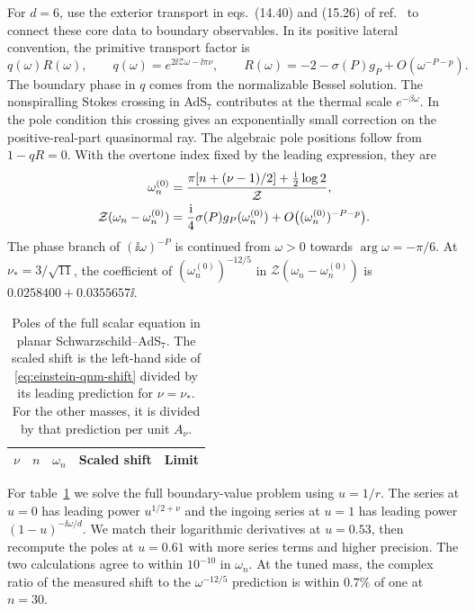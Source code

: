 For \(d=6\), use the exterior transport in eqs.~(14.40) and (15.26)
of ref.~\cite{Jia:2026} to connect these core data to boundary observables. In its
positive lateral convention, the primitive transport factor is
\begin{equation}
 q(\omega)R(\omega),\qquad
 q(\omega)=e^{2\ii\mathcal Z\omega-\ii\pi\nu},\qquad
 R(\omega)=-2-\sigma(P)g_P+O(\omega^{-P-p}) .
 \label{eq:einstein-primitive-transport}
\end{equation}
The boundary phase in \(q\) comes from the normalizable Bessel
solution. The nonspiralling Stokes crossing in AdS\(_7\) contributes
at the thermal scale \(e^{-\beta\omega}\). In the pole
condition this crossing gives an exponentially small correction
on the positive-real-part quasinormal ray. The algebraic pole
positions follow from \(1-qR=0\). With the overtone index fixed
by the leading expression, they are
\begin{align}
 \omega_n^{(0)}&=\frac{\pi[n+(\nu-1)/2]+\tfrac{\mathrm{i}}{2}\log2}
                         {\mathcal Z},\notag\\
 \mathcal Z(\omega_n-\omega_n^{(0)})
   &=\frac{\mathrm{i}}{4}\sigma(P)g_P(\omega_n^{(0)})
       +O\big((\omega_n^{(0)})^{-P-p}\big).
 \label{eq:einstein-qnm-shift}
\end{align}
The phase branch of \((\ii\omega)^{-P}\) is continued from
\(\omega>0\) towards \(\arg\omega=-\pi/6\). At
\(\nu_*=3/\sqrt{11}\), the coefficient of
\((\omega_n^{(0)})^{-12/5}\) in
\(\mathcal Z(\omega_n-\omega_n^{(0)})\) is
\(0.0258400+0.0355657\ii\).

\begin{table}[t]
 \centering\small
 \begin{tabular}{ccccc}
 \hline
 \(\nu\) & \(n\) & \(\omega_n\) & Scaled shift & Limit \\
 \hline
 
 \end{tabular}
 \caption{Poles of the full scalar equation in planar Schwarzschild--AdS\(_7\).
 The scaled shift is the left-hand side of \eqref{eq:einstein-qnm-shift}
 divided by its leading prediction for \(\nu=\nu_*\). For the other
 masses, it is divided by that prediction per unit \(A_\nu\).}
 \label{tab:einstein-poles}
\end{table}

For table~\ref{tab:einstein-poles} we solve the full boundary-value
problem using \(u=1/r\). The series at \(u=0\) has leading power
\(u^{1/2+\nu}\) and the ingoing series at \(u=1\) has leading power
\((1-u)^{-\ii\omega/d}\). We match their logarithmic derivatives
at \(u=0.53\), then recompute the poles at \(u=0.61\) with more
series terms and higher precision. The two calculations agree to
within \(10^{-10}\) in \(\omega_n\). At the tuned mass, the complex
ratio of the measured shift to the \(\omega^{-12/5}\) prediction
is within \(0.7\%\) of one at \(n=30\).

